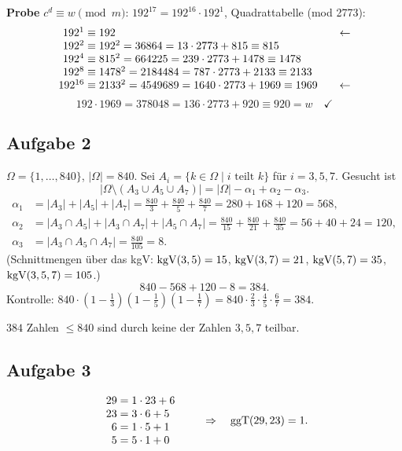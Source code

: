 \textbf{Probe} $c^d \equiv w \pmod m$: $192^{17} = 192^{16} \cdot 192^{1}$, Quadrattabelle (mod 2773):
\[
\begin{array}{r@{\;\equiv\;}l@{\qquad}l}
192^{1}  & 192 & \leftarrow\\
192^{2}  & 192^2 = 36864 = 13 \cdot 2773 + 815 \equiv 815 & \\
192^{4}  & 815^2 = 664225 = 239 \cdot 2773 + 1478 \equiv 1478 & \\
192^{8}  & 1478^2 = 2184484 = 787 \cdot 2773 + 2133 \equiv 2133 & \\
192^{16} & 2133^2 = 4549689 = 1640 \cdot 2773 + 1969 \equiv 1969 & \leftarrow
\end{array}
\]
\[
192 \cdot 1969 = 378048 = 136 \cdot 2773 + 920 \equiv 920 = w \quad\checkmark
\]

\subsection*{Aufgabe 2}
$\Omega = \{1, \dots, 840\}$, $|\Omega| = 840$. Sei $A_i = \{k \in \Omega \mid i \text{ teilt } k\}$ für $i = 3, 5, 7$.
Gesucht ist
\[
|\Omega \setminus (A_3 \cup A_5 \cup A_7)| = |\Omega| - \alpha_1 + \alpha_2 - \alpha_3 .
\]
\begin{align*}
\alpha_1 &= |A_3| + |A_5| + |A_7| = \tfrac{840}{3} + \tfrac{840}{5} + \tfrac{840}{7} = 280 + 168 + 120 = 568,\\
\alpha_2 &= |A_3 \cap A_5| + |A_3 \cap A_7| + |A_5 \cap A_7| = \tfrac{840}{15} + \tfrac{840}{21} + \tfrac{840}{35} = 56 + 40 + 24 = 120,\\
\alpha_3 &= |A_3 \cap A_5 \cap A_7| = \tfrac{840}{105} = 8 .
\end{align*}
(Schnittmengen über das kgV: $\operatorname{kgV}(3,5) = 15$, $\operatorname{kgV}(3,7) = 21$, $\operatorname{kgV}(5,7) = 35$, $\operatorname{kgV}(3,5,7) = 105$.)
\[
840 - 568 + 120 - 8 = 384 .
\]
Kontrolle: $840 \cdot (1 - \tfrac13)(1 - \tfrac15)(1 - \tfrac17) = 840 \cdot \tfrac23 \cdot \tfrac45 \cdot \tfrac67 = 384$.
\begin{ergebnis} $384$ Zahlen $\le 840$ sind durch keine der Zahlen $3, 5, 7$ teilbar. \end{ergebnis}

\subsection*{Aufgabe 3}
\[
\begin{array}{r@{\;=\;}l}
29 & 1 \cdot 23 + 6\\
23 & 3 \cdot 6 + 5\\
6 & 1 \cdot 5 + 1\\
5 & 5 \cdot 1 + 0
\end{array}
\qquad\Rightarrow\quad \ggT(29, 23) = 1 .
\]

